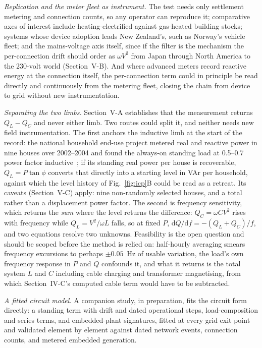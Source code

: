 \documentclass[journal]{IEEEtran}
\begin{document}
\emph{Replication and the meter fleet as instrument.} The test needs only
settlement metering and connection counts, so any operator can reproduce it;
comparative axes of interest include heating-electrified against
gas-heated building stocks; systems whose device adoption leads New
Zealand's, such as Norway's vehicle fleet; and the mains-voltage axis itself,
since if the filter is the mechanism the per-connection drift should order as
$\omega V^2$ from Japan through North America to the 230-volt world
(Section~V-B). And where advanced meters record
reactive energy at the connection itself, the per-connection term could in
principle be read directly and continuously from the metering fleet, closing
the chain from device to grid without new instrumentation.

\emph{Separating the two limbs.} Section~V-A establishes that the measurement
returns $Q_L-Q_C$ and never either limb. Two routes could split it, and neither
needs new field instrumentation. The first anchors the inductive limb at the start
of the record: the national household end-use project metered real and reactive
power in nine houses over 2002--2004 and found the always-on standing load at
0.5--0.7 power factor inductive~\cite{heep_sr155}; if its standing real power per
house is recoverable, $Q_L = P\tan\phi$ converts that directly into a starting
level in VAr per household, against which the level history of
Fig.~\ref{fig:icp}B could be read as a retreat. Its caveats (Section~V-C) apply:
nine non-randomly selected houses, and a total rather than a displacement power
factor. The second is frequency sensitivity, which returns the \emph{sum} where
the level returns the difference: $Q_C=\omega C V^2$ rises with frequency while
$Q_L=V^2/\omega L$ falls, so at fixed $P$, $\mathrm{d}Q/\mathrm{d}f =
-(Q_L+Q_C)/f$, and two equations resolve two unknowns. Feasibility is the open
question and should be scoped before the method is relied on: half-hourly
averaging smears frequency excursions to perhaps $\pm0.05$~Hz of usable variation,
the load's own frequency response in $P$ and $Q$ confounds it, and what it returns
is the total system $L$ and $C$ including cable charging and transformer
magnetising, from which Section~IV-C's computed cable term would have to be
subtracted.

\emph{A fitted circuit model.} A companion study, in preparation, fits the
circuit form directly: a standing term with drift and dated operational
steps, load-composition and series terms, and embedded-plant signatures,
fitted at every grid exit point and validated element by element against
dated network events, connection counts, and metered embedded generation.
\end{document}
